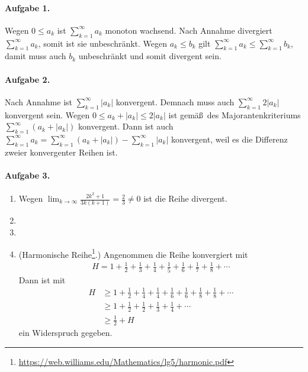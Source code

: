 \documentclass{article}
\begin{document}
\paragraph{Aufgabe 1.}

Wegen $0 \leq a_k$ ist $\sum_{k = 1}^{\infty} a_k$ monoton wachsend. Nach Annahme divergiert $\sum_{k = 1}^{\infty} a_k$, somit ist sie unbeschr\"ankt. Wegen $a_k \leq b_k$ gilt $\sum_{k = 1}^{\infty} a_k \leq \sum_{k = 1}^{\infty} b_k$, damit muss auch $b_k$ unbeschr\"ankt und somit divergent sein.

\paragraph{Aufgabe 2.}

Nach Annahme ist $\sum_{k = 1}^{\infty} |a_k|$ konvergent. Demnach muss auch $\sum_{k = 1}^{\infty} 2|a_k|$ konvergent sein. Wegen $0 \leq a_k + |a_k| \leq 2|a_k|$ ist gem\"a\ss\ des Majorantenkriteriums $\sum_{k = 1}^{\infty} (a_k + |a_k|)$ konvergent. Dann ist auch $\sum_{k = 1}^{\infty} a_k = \sum_{k = 1}^{\infty} (a_k + |a_k|) - \sum_{k = 1}^{\infty} |a_k|$ konvergent, weil es die Differenz zweier konvergenter Reihen ist.

\paragraph{Aufgabe 3.}

\begin{enumerate}
    \item Wegen $\lim_{k \to \infty} \frac{2k^2 + 1}{3k(k + 1)} = \frac{2}{3} \neq 0$ ist die Reihe divergent.
    
    \item

    \item 
    
    \item (Harmonische Reihe\footnote{\url{https://web.williams.edu/Mathematics/lg5/harmonic.pdf}}.) Angenommen die Reihe konvergiert mit
    \begin{align*}
        H = 1 + \frac{1}{2} + \frac{1}{3} + \frac{1}{4} + \frac{1}{5} + \frac{1}{6} + \frac{1}{7} + \frac{1}{8} + \cdots
    \end{align*}
    Dann ist mit 
    \begin{align*}
        H &\geq 1 + \frac{1}{2} + \frac{1}{4} + \frac{1}{4} + \frac{1}{6} + \frac{1}{6} + \frac{1}{8} + \frac{1}{8} + \cdots \\
        &\geq 1 + \frac{1}{2} + \frac{1}{2} + \frac{1}{3} + \frac{1}{4} + \cdots \\
        &\geq \frac{1}{2} + H
    \end{align*}
    ein Widerspruch gegeben.
\end{enumerate}
\end{document}
